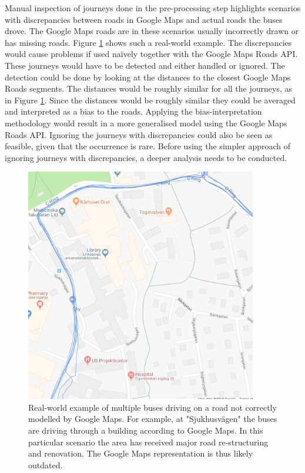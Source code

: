 Manual inspection of journeys done in the pre-processing step highlights scenarios with discrepancies between roads in Google Maps and actual roads the buses drove.
The Google Maps roads are in these scenarios usually incorrectly drawn or has missing roads.
Figure \ref{fig:gps-map-problem} shows such a real-world example.
The discrepancies would cause problems if used naïvely together with the Google Maps Roads API.
These journeys would have to be detected and either handled or ignored.
The detection could be done by looking at the distances to the closest Google Maps Roads segments.
The distances would be roughly similar for all the journeys, as in Figure \ref{fig:gps-map-problem}.
Since the distances would be roughly similar they could be averaged and interpreted as a bias to the roads.
Applying the bias-interpretation methodology would result in a more generalised model using the Google Maps Roads API.
Ignoring the journeys with discrepancies could also be seen as feasible, given that the occurrence is rare.
Before using the simpler approach of ignoring journeys with discrepancies, a deeper analysis needs to be conducted.

\begin{figure}[ht!]
    \centering
    \includegraphics[width=0.9\textwidth]{figures/gps_map_problem}
    \caption{Real-world example of multiple buses driving on a road not correctly modelled by Google Maps.
    For example, at "Sjukhusvägen" the buses are driving through a building according to Google Maps.
    In this particular scenario the area has received major road re-structuring and renovation.
    The Google Maps representation is thus likely outdated.}
    \label{fig:gps-map-problem}
\end{figure}

